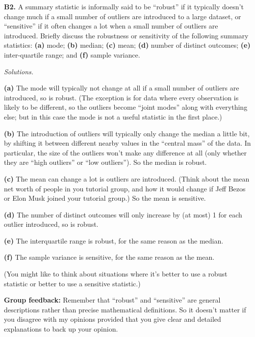 \documentclass[
  a4paper,
]{book}
\theoremstyle{definition}
\theoremstyle{definition}
\theoremstyle{definition}
\theoremstyle{definition}
\theoremstyle{remark}
\begin{document}
\textbf{B2.} A summary statistic is informally said to be ``robust'' if it typically doesn't change much if a small number of outliers are introduced to a large dataset, or ``sensitive'' if it often changes a lot when a small number of outliers are introduced. Briefly discuss the robustness or sensitivity of the following summary statistics: \textbf{(a)} mode; \textbf{(b)} median; \textbf{(c)} mean; \textbf{(d)} number of distinct outcomes; \textbf{(e)} inter-quartile range; and \textbf{(f)} sample variance.

\begin{myanswers}
\emph{Solutions.}

\textbf{(a)} The mode will typically not change at all if a small number of outliers are introduced, so is robust. (The exception is for data where every observation is likely to be different, so the outliers become ``joint modes'' along with everything else; but in this case the mode is not a useful statistic in the first place.)

\textbf{(b)} The introduction of outliers will typically only change the median a little bit, by shifting it between different nearby values in the ``central mass'' of the data. In particular, the size of the outliers won't make any difference at all (only whether they are ``high outliers'' or ``low outliers''). So the median is robust.

\textbf{(c)} The mean can change a lot is outliers are introduced. (Think about the mean net worth of people in you tutorial group, and how it would change if Jeff Bezos or Elon Musk joined your tutorial group.) So the mean is sensitive.

\textbf{(d)} The number of distinct outcomes will only increase by (at most) 1 for each outlier introduced, so is robust.

\textbf{(e)} The interquartile range is robust, for the same reason as the median.

\textbf{(f)} The sample variance is sensitive, for the same reason as the mean.

(You might like to think about situations where it's better to use a robust statistic or better to use a sensitive statistic.)

\textbf{Group feedback:} Remember that ``robust'' and ``sensitive'' are general descriptions rather than precise mathematical definitions. So it doesn't matter if you disagree with my opinions provided that you give clear and detailed explanations to back up your opinion.

\end{myanswers}
\end{document}
